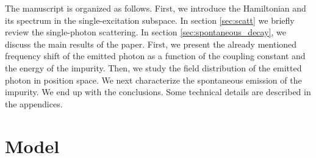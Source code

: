\documentclass[aps,pra,twocolumn,floatfix,superscriptaddress]{revtex4-1}%
\begin{document}

The manuscript is organized as follows. First, we introduce the Hamiltonian and its spectrum in the single-excitation subspace.  In section \ref{sec:scatt} we briefly review the single-photon scattering. In section \ref{sec:spontaneous_decay}, we discuss the main results of the paper. First, we present the already mentioned frequency shift of the emitted photon as a function of the coupling constant and the energy of the impurity. Then, we study the field distribution of the emitted photon in position space. We next characterize the spontaneous emission of the impurity.
We end up with the conclusions. Some technical details are described in the appendices.


\section{Model}\label{sec:model}
\end{document}
